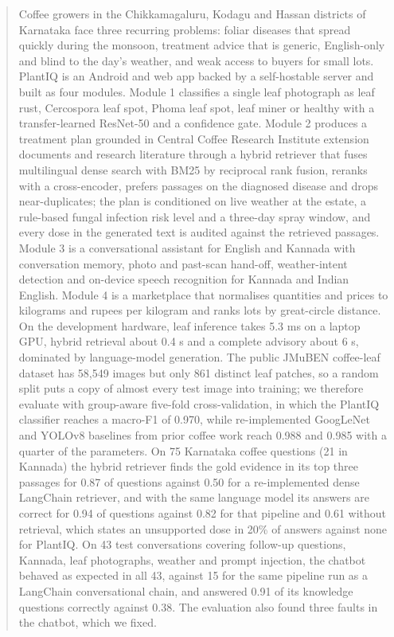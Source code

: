 \begin{abstract}
Coffee growers in the Chikkamagaluru, Kodagu and Hassan districts of Karnataka face three recurring problems: foliar
diseases that spread quickly during the monsoon, treatment advice that is generic, English-only and blind to the day's
weather, and weak access to buyers for small lots. PlantIQ is an Android and web app backed by a self-hostable server
and built as four modules. Module 1 classifies a single leaf photograph as leaf rust, Cercospora
leaf spot, Phoma leaf spot, leaf miner or healthy with a transfer-learned ResNet-50 and a confidence gate. Module 2
produces a treatment plan grounded in Central Coffee Research Institute extension documents and research literature
through a hybrid retriever that fuses multilingual dense search with BM25 by reciprocal rank fusion, reranks with a
cross-encoder, prefers passages on the diagnosed disease and drops near-duplicates; the plan is conditioned on live weather at the
estate, a rule-based fungal infection risk level and a three-day spray window, and every dose in the generated text is
audited against the retrieved passages. Module 3 is a conversational assistant for English and Kannada with
conversation memory, photo and past-scan hand-off, weather-intent detection and on-device speech recognition for
Kannada and Indian English. Module 4 is a marketplace that normalises quantities and prices to kilograms and rupees per
kilogram and ranks lots by great-circle distance. On the development hardware, leaf inference takes 5.3 ms on a laptop
GPU, hybrid retrieval about 0.4 s and a complete advisory about 6 s, dominated by language-model generation.
The public JMuBEN coffee-leaf dataset has 58,549 images but only 861 distinct leaf patches, so a random split puts a
copy of almost every test image into training; we therefore evaluate with group-aware five-fold cross-validation, in
which the PlantIQ classifier reaches a macro-F1 of 0.970, while re-implemented GoogLeNet and
YOLOv8 baselines from prior coffee work reach 0.988 and 0.985 with a quarter of the parameters.
On 75 Karnataka coffee questions (21 in Kannada) the hybrid retriever finds the gold evidence in its top three
passages for 0.87 of questions against 0.50 for a re-implemented dense LangChain retriever, and
with the same language model its answers are correct for 0.94 of questions against 0.82 for that pipeline and
0.61 without retrieval, which states an unsupported dose in 20\% of answers against none for PlantIQ. On 43 test conversations covering follow-up questions, Kannada, leaf photographs, weather and
prompt injection, the chatbot behaved as expected in all 43, against 15 for the same pipeline run as a LangChain
conversational chain, and answered 0.91 of its knowledge questions correctly against 0.38. The evaluation also found
three faults in the chatbot, which we fixed.
\end{abstract}

